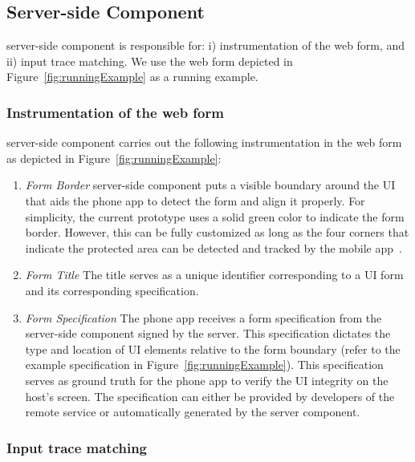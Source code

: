 \subsection{Server-side Component}
\label{sec:systemDesign:webserver}

\name server-side component is responsible for: i) instrumentation of the web form, and ii) input trace matching. We use the web form depicted in Figure~\ref{fig:runningExample} as a running example.

\subsubsection{Instrumentation of the web form}
\label{sec:systemDesign:webserver:instr}

\name server-side component carries out the following instrumentation in the web form as depicted in Figure~\ref{fig:runningExample}:

\begin{enumerate}	

\item[\one] \emph{Form Border} \sysname server-side component puts a visible boundary around the UI that aids the \sysname phone app to detect the form and align it properly. For simplicity, the current prototype uses a solid green color to indicate the form border.
However, this can be fully customized as long as the four corners that indicate the protected area can be detected and tracked by the mobile app~\cite{zhang2002visual}.



\item[\two] \emph{Form Title} The title serves as a unique identifier corresponding to a UI form and its corresponding specification.

\item[\three] \emph{Form Specification} The \sysname phone app receives a form specification from the server-side component signed by the server. This specification dictates the type and location of UI elements relative to the form boundary (refer to the example specification in Figure~\ref{fig:runningExample}). This specification serves as ground truth for the phone app to verify the UI integrity on the host's screen. The specification can either be provided by developers of the remote service or automatically generated by the \sysname server component.

\end{enumerate}

\subsubsection{Input trace matching}

